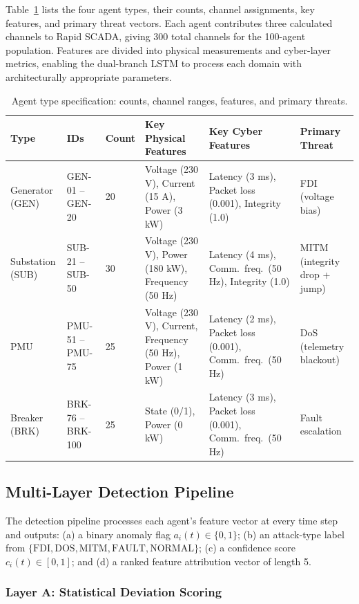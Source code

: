 Table~\ref{tab:agenttypes} lists the four agent types, their counts, channel assignments, key
features, and primary threat vectors. Each agent contributes three calculated channels to Rapid
SCADA, giving 300 total channels for the 100-agent population. Features are divided into physical
measurements and cyber-layer metrics, enabling the dual-branch LSTM to process each domain with
architecturally appropriate parameters.

\begin{table}[htbp]
\centering
\caption{Agent type specification: counts, channel ranges, features, and primary threats.}
\label{tab:agenttypes}
\small
\begin{tabular}{@{}llllll@{}}
\hline
\textbf{Type} & \textbf{IDs} & \textbf{Count} & \textbf{Key Physical Features} &
\textbf{Key Cyber Features} & \textbf{Primary Threat} \\
\hline
Generator (GEN) & GEN-01 -- GEN-20 & 20 & Voltage (230 V), Current (15 A), Power (3 kW) &
Latency (3 ms), Packet loss (0.001), Integrity (1.0) & FDI (voltage bias) \\
Substation (SUB) & SUB-21 -- SUB-50 & 30 & Voltage (230 V), Power (180 kW), Frequency (50 Hz) &
Latency (4 ms), Comm.\ freq.\ (50 Hz), Integrity (1.0) & MITM (integrity drop + jump) \\
PMU & PMU-51 -- PMU-75 & 25 & Voltage (230 V), Current, Frequency (50 Hz), Power (1 kW) &
Latency (2 ms), Packet loss (0.001), Comm.\ freq.\ (50 Hz) & DoS (telemetry blackout) \\
Breaker (BRK) & BRK-76 -- BRK-100 & 25 & State (0/1), Power (0 kW) &
Latency (3 ms), Packet loss (0.001), Comm.\ freq.\ (50 Hz) & Fault escalation \\
\hline
\end{tabular}
\end{table}

\subsection{Multi-Layer Detection Pipeline}
\label{sec:detection}

The detection pipeline processes each agent's feature vector at every time step and outputs:
(a) a binary anomaly flag $a_i(t) \in \{0,1\}$; (b) an attack-type label from
$\{\text{FDI}, \text{DOS}, \text{MITM}, \text{FAULT}, \text{NORMAL}\}$; (c) a confidence score
$c_i(t) \in [0,1]$; and (d) a ranked feature attribution vector of length 5.

\subsubsection{Layer A: Statistical Deviation Scoring}
\label{sec:layera}

